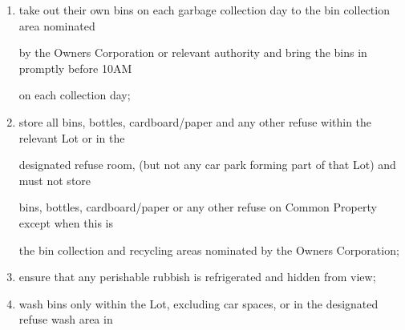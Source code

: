 \documentclass{article}
\begin{document}
\begin{enumerate}[label=\arabic*.]
\begin{enumerate}[label=\arabic{enumi}.\arabic*.]
\begin{enumerate}[label=(\arabic*)]
\begin{enumerate}[label=(\alph*)]
{\fontsize{10.02}{1}nominated by the Owners Corporation (acting reasonably) or as agreed by the respective Lot }

{\fontsize{10.02}{1}Owners or Occupiers. The cost associated with the garbage contractor’s services is a charge }

{\fontsize{10.02}{1}payable by those Lots which are used for the retail sale or commercial preparation of food }

{\fontsize{10.02}{1}and/or beverages on a proportional basis as determined by the Manager (acting reasonably) }

{\fontsize{10.02}{1}and is an additional charge over and above the normal Owners Corporation fees; }

{\fontsize{9.962}{1}(i) ensure that any contractors hired for the purpose of removing garbage, must pick up }

{\fontsize{10.02}{1}the garbage between: }

{\fontsize{9.962}{1}(ii) 7AM and 9AM, if any rubbish is being picked up on Monday to Saturday; and }

{\fontsize{9.962}{1}(iii) Between 9AM and 10AM, if any rubbish is being picked up on Sunday. }

\item {\fontsize{9.962}{1} take out their own bins on each garbage collection day to the bin collection area nominated }

{\fontsize{10.02}{1}by the Owners Corporation or relevant authority and bring the bins in promptly before 10AM }

{\fontsize{10.02}{1}on each collection day; }

\item {\fontsize{9.962}{1} store all bins, bottles, cardboard/paper and any other refuse within the relevant Lot or in the }

{\fontsize{10.02}{1}designated refuse room, (but not any car park forming part of that Lot) and must not store }

{\fontsize{10.02}{1}bins, bottles, cardboard/paper or any other refuse on Common Property except when this is }

{\fontsize{10.02}{1}the bin collection and recycling areas nominated by the Owners Corporation; }

\item {\fontsize{9.962}{1} ensure that any perishable rubbish is refrigerated and hidden from view; }

\item {\fontsize{9.962}{1} wash bins only within the Lot, excluding car spaces, or in the designated refuse wash area in }


\end{enumerate}
\end{enumerate}
\end{enumerate}
\end{enumerate}
\end{document}
